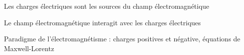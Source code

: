 Les charges électriques sont les sources du champ électromagnétique

Le champ électromagnétique interagit avec les charges électriques

\begin{center}
Paradigme de l'électromagnétisme : charges positives et négative, équations de Maxwell-Lorentz
\end{center}

\subsection{}\subsection{}
\begin{center}
\end{center}

